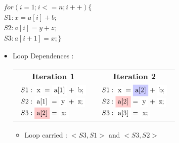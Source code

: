 \documentclass{beamer}
\begin{document}
\frame
{
	\frametitle{\subsecname}
	\begin{center}
	$\begin{array}{lcl}
	for(i = 1; i <= n; i++) \{\\
	S1: x = a[i] + b;\\
	S2: a[i] = y + z;\\
	S3: a[i + 1] = x; \}
	\end{array}$ \\
	\end{center}
	\begin{itemize}
	\item Loop Dependences : 	
	\begin{table}
	\centering
	\begin{tabular}{c c} %
	\textbf{Iteration 1} & \textbf{Iteration 2} \\
	{$\begin{array}{lcl}
	S1: \tikz[baseline]{\node[fill=white!20,anchor=base]{x};} = \tikz[baseline]{\node[fill=white!20,anchor=base]{a[1]};} + \tikz[baseline]{\node[fill=white!20,anchor=base]{b;};}\\
	S2: \tikz[baseline]{\node[fill=white!20,anchor=base]{a[1]};} = \tikz[baseline]{\node[fill=white!20,anchor=base]{y};} + \tikz[baseline]{\node[fill=white!20,anchor=base]{z;};}\\
	S3: \tikz[baseline]{\node[fill=red!20,anchor=base]{a[2]};} = \tikz[baseline]{\node[fill=white!20,anchor=base]{x;};}
	\end{array}$}
	&
	{$\begin{array}{lcl}
	S1: \tikz[baseline]{\node[fill=white!20,anchor=base]{x};} = \tikz[baseline]{\node[fill=blue!20,anchor=base]{a[2]};} + \tikz[baseline]{\node[fill=white!20,anchor=base]{b;};}\\
	S2: \tikz[baseline]{\node[fill=red!20,anchor=base]{a[2]};} = \tikz[baseline]{\node[fill=white!20,anchor=base]{y};} + \tikz[baseline]{\node[fill=white!20,anchor=base]{z;};}\\
	S3: \tikz[baseline]{\node[fill=white!20,anchor=base]{a[3]};} = \tikz[baseline]{\node[fill=white!20,anchor=base]{x;};}
	\end{array}$} \\

	\end{tabular}
	\end{table}
	\begin{itemize}
	\item Loop carried : $<S3, S1>$ and $<S3, S2>$
	
	\end{itemize}
	
	\end{itemize}
	
}
\end{document}
